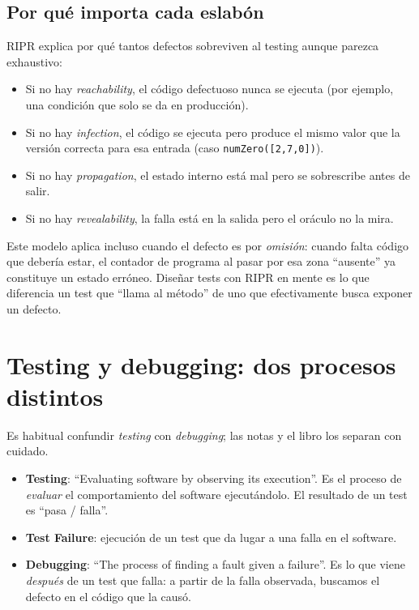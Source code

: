 \documentclass[12pt,a4paper]{article}
\begin{document}
\subsection{Por qué importa cada eslabón}
RIPR explica por qué tantos defectos sobreviven al testing aunque parezca exhaustivo:
\begin{itemize}
  \item Si no hay \textit{reachability}, el código defectuoso nunca se ejecuta (por ejemplo, una condición que solo se da en producción).
  \item Si no hay \textit{infection}, el código se ejecuta pero produce el mismo valor que la versión correcta para esa entrada (caso \texttt{numZero([2,7,0])}).
  \item Si no hay \textit{propagation}, el estado interno está mal pero se sobrescribe antes de salir.
  \item Si no hay \textit{revealability}, la falla está en la salida pero el oráculo no la mira.
\end{itemize}

Este modelo aplica incluso cuando el defecto es por \textit{omisión}: cuando falta código que debería estar, el contador de programa al pasar por esa zona ``ausente'' ya constituye un estado erróneo. Diseñar tests con RIPR en mente es lo que diferencia un test que ``llama al método'' de uno que efectivamente busca exponer un defecto.

\section{Testing y debugging: dos procesos distintos}
Es habitual confundir \textit{testing} con \textit{debugging}; las notas y el libro los separan con cuidado.

\begin{itemize}
  \item \textbf{Testing}: ``Evaluating software by observing its execution''. Es el proceso de \textit{evaluar} el comportamiento del software ejecutándolo. El resultado de un test es ``pasa / falla''.
  \item \textbf{Test Failure}: ejecución de un test que da lugar a una falla en el software.
  \item \textbf{Debugging}: ``The process of finding a fault given a failure''. Es lo que viene \textit{después} de un test que falla: a partir de la falla observada, buscamos el defecto en el código que la causó.
\end{itemize}
\end{document}
